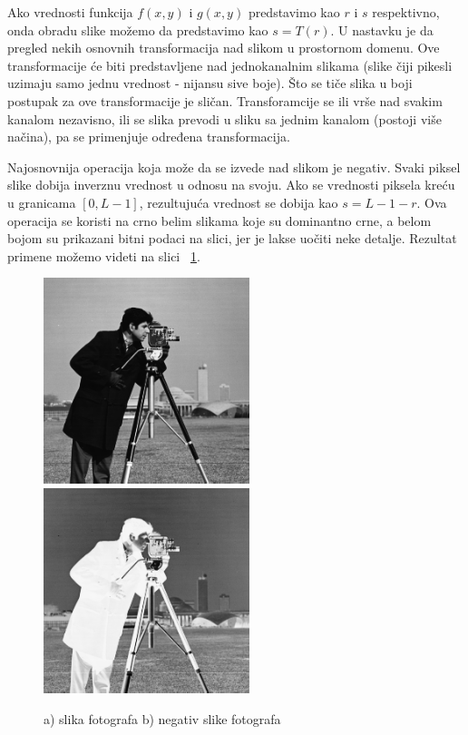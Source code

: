 \documentclass[a4paper,12pt,titlepage]{article}
\begin{document}
Ako vrednosti funkcija $f(x, y)$ i $g(x, y)$ predstavimo kao $r$ i $s$ respektivno, onda obradu slike možemo da predstavimo kao $s = T(r)$. U nastavku je da pregled nekih osnovnih transformacija nad slikom u prostornom domenu. Ove transformacije će biti predstavljene nad jednokanalnim slikama (slike čiji pikesli uzimaju samo jednu vrednost - nijansu sive boje). Što se tiče slika u boji postupak za ove transformacije je sličan. Transforamcije se ili vrše nad svakim kanalom nezavisno, ili se slika prevodi u sliku sa jednim kanalom (postoji više načina), pa se primenjuje određena transformacija.

Najosnovnija operacija koja može da se izvede nad slikom je negativ. Svaki piksel slike dobija inverznu vrednost u odnosu na svoju. Ako se vrednosti piksela kreću u granicama $[0, L - 1]$, rezultujuća vrednost se dobija kao $s = L - 1 - r$. Ova operacija se koristi na crno belim slikama koje su dominantno crne, a belom bojom su prikazani bitni podaci na slici, jer je lakse uočiti neke detalje. Rezultat primene možemo videti na slici ~\ref{negativ}. 

\begin{figure}[ht!]
\centering
\includegraphics[width=60mm]{img/img.png}
\includegraphics[width=60mm]{img/imgNegative.png}
\caption{a) slika fotografa b) negativ slike fotografa}
\label{negativ}
\end{figure} 
\end{document}
